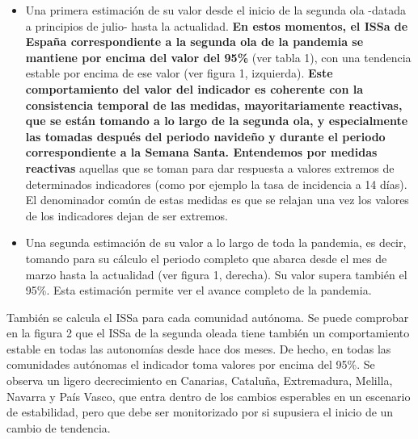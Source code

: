 \documentclass[
  11pt,
]{article}
\begin{document}
\begin{itemize}
\item
  Una primera estimación de su valor desde el inicio de la segunda ola
  -datada a principios de julio- hasta la actualidad. \textbf{En estos
  momentos, el ISSa de España correspondiente a la segunda ola de la
  pandemia se mantiene por encima del valor del 95\%} (ver tabla 1), con
  una tendencia estable por encima de ese valor (ver figura 1,
  izquierda). \textbf{Este comportamiento del valor del indicador es
  coherente con la consistencia temporal de las medidas,
  mayoritariamente reactivas, que se están tomando a lo largo de la
  segunda ola, y especialmente las tomadas después del periodo navideño
  y durante el periodo correspondiente a la Semana Santa. Entendemos por
  medidas reactivas} aquellas que se toman para dar respuesta a valores
  extremos de determinados indicadores (como por ejemplo la tasa de
  incidencia a 14 días). El denominador común de estas medidas es que se
  relajan una vez los valores de los indicadores dejan de ser extremos.
\item
  Una segunda estimación de su valor a lo largo de toda la pandemia, es
  decir, tomando para su cálculo el periodo completo que abarca desde el
  mes de marzo hasta la actualidad (ver figura 1, derecha). Su valor
  supera también el 95\%. Esta estimación permite ver el avance completo
  de la pandemia.
\end{itemize}

También se calcula el ISSa para cada comunidad autónoma. Se puede
comprobar en la figura 2 que el ISSa de la segunda oleada tiene también
un comportamiento estable en todas las autonomías desde hace dos meses.
De hecho, en todas las comunidades autónomas el indicador toma valores
por encima del 95\%. Se observa un ligero decrecimiento en Canarias,
Cataluña, Extremadura, Melilla, Navarra y País Vasco, que entra dentro
de los cambios esperables en un escenario de estabilidad, pero que debe
ser monitorizado por si supusiera el inicio de un cambio de tendencia.
\end{document}
